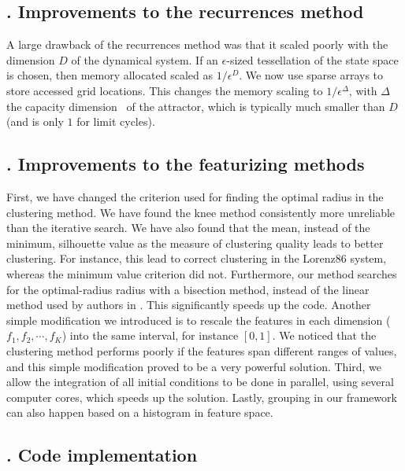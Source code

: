 \documentclass[9pt,twocolumn,twoside,lineno]{pnas-new}
\begin{document}
{\subsection*{. Improvements to the recurrences method}

A large drawback of the recurrences method was that it scaled poorly with the dimension $D$ of the dynamical system. If an $\epsilon$-sized tessellation of the state space is chosen, then memory allocated scaled as $1/\epsilon^D$. We now use sparse arrays to store accessed grid locations. This changes the memory scaling to $1/\epsilon^\Delta$, with $\Delta$ the capacity dimension~\cite{DatserisBook} of the attractor, which is typically much smaller than $D$ (and is only $1$ for limit cycles).

\subsection*{. Improvements to the featurizing methods}
First, we have changed the criterion used for finding the optimal radius in the clustering method. We have found the knee method consistently more unreliable than the iterative search. We have also found that the mean, instead of the minimum, silhouette value as the measure of clustering quality leads to better clustering. For instance, this lead to correct clustering in the Lorenz86 system, whereas the minimum value criterion did not. Furthermore, our method searches for the optimal-radius radius with a bisection method, instead of the linear method used by authors in \cite{Stender2021}. This significantly speeds up the code. 
Another simple modification we introduced is to rescale the features in each dimension ($f_1, f_2, \cdots, f_K$) into the same interval, for instance $[0,1]$. We noticed that the clustering method performs poorly if the features span different ranges of values, and this simple modification proved to be a very powerful solution.
Third, we allow the integration of all initial conditions to be done in parallel, using several computer cores, which speeds up the solution.
Lastly, grouping in our framework can also happen based on a histogram in feature space.

\subsection*{. Code implementation}

}
\end{document}
